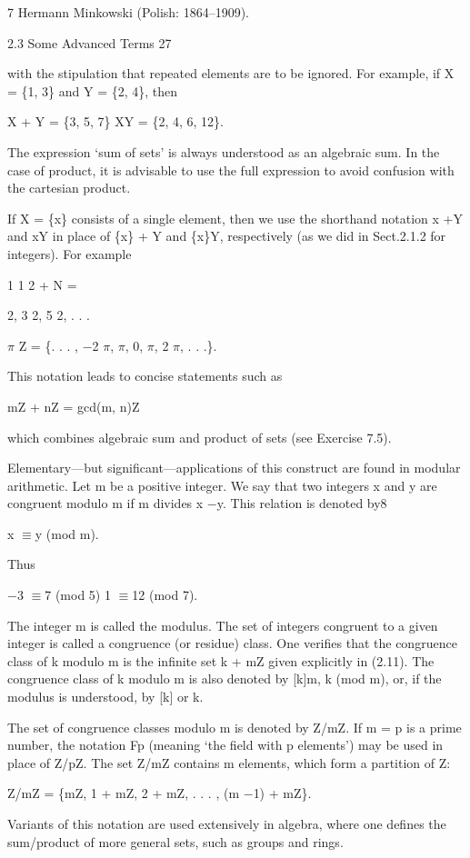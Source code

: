 \documentclass[11pt]{article}
\theoremstyle{plain}
\theoremstyle{definition}
\begin{document}
7 Hermann Minkowski (Polish: 1864--1909).

2.3 Some Advanced Terms 27

with the stipulation that repeated elements are to be ignored. For example, if X = \{1, 3\} and Y = \{2, 4\}, then

X + Y = \{3, 5, 7\} XY = \{2, 4, 6, 12\}.

The expression `sum of sets' is always understood as an algebraic sum. In the case of product, it is advisable to use the full expression to avoid confusion with the cartesian product.

If X = \{x\} consists of a single element, then we use the shorthand notation x +Y and xY in place of \{x\} + Y and \{x\}Y, respectively (as we did in Sect.2.1.2 for integers). For example

1 1 2 + N =

2, 3 2, 5 2, . . .

$\pi$ Z = \{. . . , $-$2 $\pi$, $\pi$, 0, $\pi$, 2 $\pi$, . . .\}.

This notation leads to concise statements such as

mZ + nZ = gcd(m, n)Z

which combines algebraic sum and product of sets (see Exercise 7.5).

Elementary---but significant---applications of this construct are found in modular arithmetic. Let m be a positive integer. We say that two integers x and y are congruent modulo m if m divides x $-$y. This relation is denoted by8

x $\equiv$y (mod m).

Thus

$-$3 $\equiv$7 (mod 5) 1 $\equiv$12 (mod 7).

The integer m is called the modulus. The set of integers congruent to a given integer is called a congruence (or residue) class. One verifies that the congruence class of k modulo m is the infinite set k + mZ given explicitly in (2.11). The congruence class of k modulo m is also denoted by [k]m, k (mod m), or, if the modulus is understood, by [k] or k.

The set of congruence classes modulo m is denoted by Z/mZ. If m = p is a prime number, the notation Fp (meaning `the field with p elements') may be used in place of Z/pZ. The set Z/mZ contains m elements, which form a partition of Z:

Z/mZ = \{mZ, 1 + mZ, 2 + mZ, . . . , (m $-$1) + mZ\}.

Variants of this notation are used extensively in algebra, where one defines the sum/product of more general sets, such as groups and rings.
\end{document}
